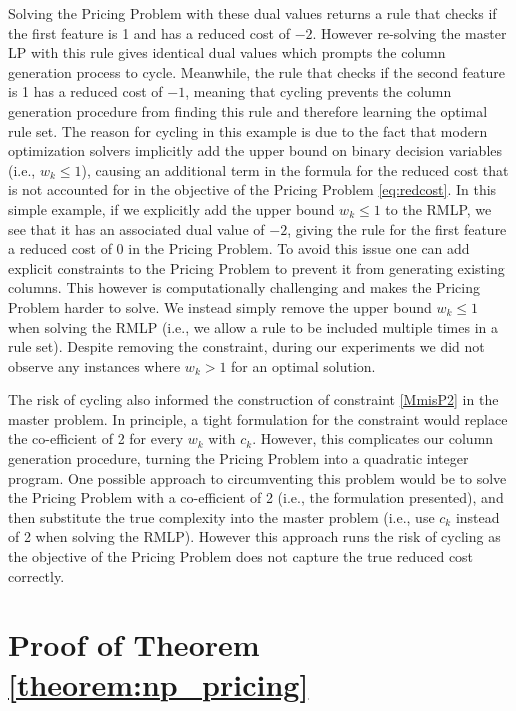\documentclass[twoside,11pt]{article}
\begin{document}
Solving the Pricing Problem with these dual values returns a rule that checks if the first feature is 1 and has a reduced cost of $-2$. However re-solving the master LP with this rule gives identical dual values which prompts the column generation process to cycle. Meanwhile, the rule that checks if the second feature is 1 has a reduced cost of $-1$, meaning that cycling prevents the column generation procedure from finding this rule and therefore learning the optimal rule set. The reason for cycling in this example is due to the fact that modern optimization solvers implicitly add the upper bound on binary decision variables (i.e., $w_k \leq 1$), causing an additional term in the formula for the reduced cost that is not accounted for in the objective of the Pricing Problem \eqref{eq:redcost}. In this simple example, if we explicitly add the upper bound $w_k \leq 1$ to the RMLP, we see that it has an associated dual value of $-2$, giving the rule for the first feature a reduced cost of 0 in the Pricing Problem. To avoid this issue one can add explicit constraints to the Pricing Problem to prevent it from generating existing columns. This however is computationally challenging and makes the Pricing Problem harder to solve. We instead simply remove the upper bound $w_k \leq 1$ when solving the RMLP (i.e., we allow a rule to be included multiple times in a rule set). Despite removing the constraint, during our experiments we did not observe any instances where $w_k > 1$ for an optimal solution.

The risk of cycling also informed the construction of constraint \eqref{MmisP2} in the master problem. In principle, a tight formulation for the constraint would replace the co-efficient of 2 for every $w_k$ with $c_k$. However, this complicates our column generation procedure, turning the Pricing Problem into a quadratic integer program. One possible approach to circumventing this problem would be to solve the Pricing Problem with a co-efficient of 2 (i.e., the formulation presented), and then substitute the true complexity into the master problem (i.e., use $c_k$ instead of 2 when solving the RMLP). However this approach runs the risk of cycling as the objective of the Pricing Problem does not capture the true reduced cost correctly.

\section{Proof of Theorem \ref{theorem:np_pricing}} \label{app:pf_np_pricing} 
\end{document}
